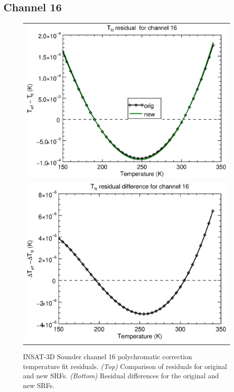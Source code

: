 \subsection{Channel 16}
\begin{figure}[H]
  \centering
  \begin{tabular}{c}
    \includegraphics[scale=0.55]{graphics/sndr/tfit/sndr_insat3d-16.tfit.eps} \\
    \includegraphics[scale=0.55]{graphics/sndr/tfit/sndr_insat3d-16.tfit.difference.eps}
  \end{tabular}
  \caption{INSAT-3D Sounder channel 16 polychromatic correction temperature fit residuals. \emph{(Top)} Comparison of residuals for original and new SRFs. \emph{(Bottom)} Residual differences for the original and new SRFs.}
  \label{fig:sndr_ch16_tfit}
\end{figure}

